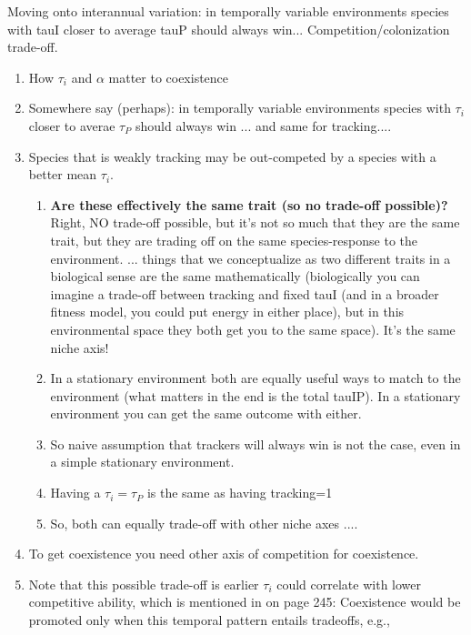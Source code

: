 \documentclass[11pt,letterpaper]{article}
\begin{document}
\begin{enumerate}
\begin{enumerate}
Moving onto interannual variation: in temporally variable environments species with tauI closer to average tauP should always win... 
Competition/colonization trade-off.
\begin{enumerate}
\item How $\tau_i$ and $\alpha$ matter to coexistence
\item Somewhere say (perhaps): in temporally variable environments species with $\tau_i$ closer to averae $\tau_{P}$ should always win ... and same for tracking....
\item Species that is weakly tracking may be out-competed by a species with a better mean $\tau_i$. 
\begin{enumerate}
\item {\bf Are these effectively the same trait (so no trade-off possible)?} Right, NO trade-off possible, but it's not so much that they are the same trait, but they are trading off on the same species-response to the environment. ... things that we conceptualize as two different traits in a biological sense are the same mathematically (biologically you can imagine a trade-off between tracking and fixed tauI (and in a broader fitness model, you could put energy in either place), but in this environmental space they both get you to the same space). It's the same niche axis!
\item  In a stationary environment both are equally useful ways to match to the environment (what matters in the end is the total tauIP). In a stationary environment you can get the same outcome with either. 
\item So naive assumption that trackers will always win is not the case, even in a simple stationary environment.
\item Having a $\tau_i = \tau_P$ is the same as having tracking=1
\item So, both can equally trade-off with other niche axes .... 
\end{enumerate}
\item To get coexistence you need other axis of competition for coexistence. \item Note that this possible trade-off is earlier \(\tau_{i}\) could correlate with lower competitive ability, which is mentioned in \citet{Chesson:2004eo} on page 245: Coexistence would be promoted only when this temporal pattern entails tradeoffs, e.g.,

\end{enumerate}
\end{enumerate}
\end{enumerate}
\end{document}
